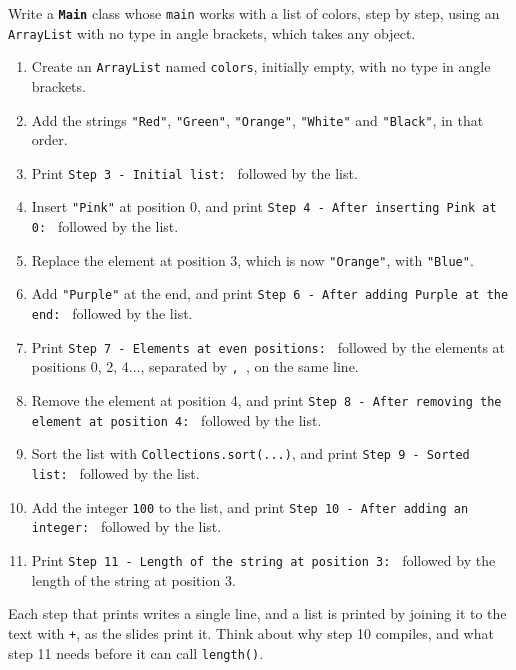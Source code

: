 Write a \textbf{\texttt{Main}} class whose \texttt{main} works with a list of colors, step by step, using an \texttt{ArrayList} with no type in angle brackets, which takes any object.

\begin{enumerate}

    \item Create an \texttt{ArrayList} named \texttt{colors}, initially empty, with no type in angle brackets.

    \item Add the strings \texttt{"Red"}, \texttt{"Green"}, \texttt{"Orange"}, \texttt{"White"} and \texttt{"Black"}, in that order.

    \item Print \texttt{Step 3 - Initial list: } followed by the list.

    \item Insert \texttt{"Pink"} at position 0, and print \texttt{Step 4 - After inserting Pink at 0: } followed by the list.

    \item Replace the element at position 3, which is now \texttt{"Orange"}, with \texttt{"Blue"}.

    \item Add \texttt{"Purple"} at the end, and print \texttt{Step 6 - After adding Purple at the end: } followed by the list.

    \item Print \texttt{Step 7 - Elements at even positions: } followed by the elements at positions 0, 2, 4..., separated by \texttt{, }, on the same line.

    \item Remove the element at position 4, and print \texttt{Step 8 - After removing the element at position 4: } followed by the list.

    \item Sort the list with \texttt{Collections.sort(...)}, and print \texttt{Step 9 - Sorted list: } followed by the list.

    \item Add the integer \texttt{100} to the list, and print \texttt{Step 10 - After adding an integer: } followed by the list.

    \item Print \texttt{Step 11 - Length of the string at position 3: } followed by the length of the string at position 3.

\end{enumerate}

Each step that prints writes a single line, and a list is printed by joining it to the text with \texttt{+}, as the slides print it. Think about why step 10 compiles, and what step 11 needs before it can call \texttt{length()}.
